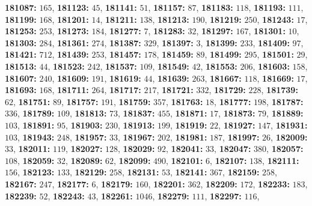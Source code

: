 \textsf{\bfseries 181087:} $165$, \textsf{\bfseries 181123:} $45$, \textsf{\bfseries 181141:} $51$, \textsf{\bfseries 181157:} $87$, \textsf{\bfseries 181183:} $118$, \textsf{\bfseries 181193:} $111$, \textsf{\bfseries 181199:} $168$, \textsf{\bfseries 181201:} $14$, \textsf{\bfseries 181211:} $138$, \textsf{\bfseries 181213:} $190$, \textsf{\bfseries 181219:} $250$, \textsf{\bfseries 181243:} $17$, \textsf{\bfseries 181253:} $253$, \textsf{\bfseries 181273:} $184$, \textsf{\bfseries 181277:} $7$, \textsf{\bfseries 181283:} $32$, \textsf{\bfseries 181297:} $167$, \textsf{\bfseries 181301:} $10$, \textsf{\bfseries 181303:} $284$, \textsf{\bfseries 181361:} $274$, \textsf{\bfseries 181387:} $329$, \textsf{\bfseries 181397:} $3$, \textsf{\bfseries 181399:} $233$, \textsf{\bfseries 181409:} $97$, \textsf{\bfseries 181421:} $712$, \textsf{\bfseries 181439:} $253$, \textsf{\bfseries 181457:} $178$, \textsf{\bfseries 181459:} $89$, \textsf{\bfseries 181499:} $295$, \textsf{\bfseries 181501:} $29$, \textsf{\bfseries 181513:} $44$, \textsf{\bfseries 181523:} $242$, \textsf{\bfseries 181537:} $109$, \textsf{\bfseries 181549:} $42$, \textsf{\bfseries 181553:} $206$, \textsf{\bfseries 181603:} $158$, \textsf{\bfseries 181607:} $240$, \textsf{\bfseries 181609:} $191$, \textsf{\bfseries 181619:} $44$, \textsf{\bfseries 181639:} $263$, \textsf{\bfseries 181667:} $118$, \textsf{\bfseries 181669:} $17$, \textsf{\bfseries 181693:} $168$, \textsf{\bfseries 181711:} $264$, \textsf{\bfseries 181717:} $217$, \textsf{\bfseries 181721:} $332$, \textsf{\bfseries 181729:} $228$, \textsf{\bfseries 181739:} $62$, \textsf{\bfseries 181751:} $89$, \textsf{\bfseries 181757:} $191$, \textsf{\bfseries 181759:} $357$, \textsf{\bfseries 181763:} $18$, \textsf{\bfseries 181777:} $198$, \textsf{\bfseries 181787:} $336$, \textsf{\bfseries 181789:} $109$, \textsf{\bfseries 181813:} $73$, \textsf{\bfseries 181837:} $455$, \textsf{\bfseries 181871:} $17$, \textsf{\bfseries 181873:} $79$, \textsf{\bfseries 181889:} $103$, \textsf{\bfseries 181891:} $95$, \textsf{\bfseries 181903:} $230$, \textsf{\bfseries 181913:} $199$, \textsf{\bfseries 181919:} $22$, \textsf{\bfseries 181927:} $147$, \textsf{\bfseries 181931:} $103$, \textsf{\bfseries 181943:} $248$, \textsf{\bfseries 181957:} $33$, \textsf{\bfseries 181967:} $202$, \textsf{\bfseries 181981:} $187$, \textsf{\bfseries 181997:} $26$, \textsf{\bfseries 182009:} $33$, \textsf{\bfseries 182011:} $119$, \textsf{\bfseries 182027:} $128$, \textsf{\bfseries 182029:} $92$, \textsf{\bfseries 182041:} $33$, \textsf{\bfseries 182047:} $380$, \textsf{\bfseries 182057:} $108$, \textsf{\bfseries 182059:} $32$, \textsf{\bfseries 182089:} $62$, \textsf{\bfseries 182099:} $490$, \textsf{\bfseries 182101:} $6$, \textsf{\bfseries 182107:} $138$, \textsf{\bfseries 182111:} $156$, \textsf{\bfseries 182123:} $133$, \textsf{\bfseries 182129:} $258$, \textsf{\bfseries 182131:} $53$, \textsf{\bfseries 182141:} $367$, \textsf{\bfseries 182159:} $258$, \textsf{\bfseries 182167:} $247$, \textsf{\bfseries 182177:} $6$, \textsf{\bfseries 182179:} $160$, \textsf{\bfseries 182201:} $362$, \textsf{\bfseries 182209:} $172$, \textsf{\bfseries 182233:} $183$, \textsf{\bfseries 182239:} $52$, \textsf{\bfseries 182243:} $43$, \textsf{\bfseries 182261:} $1046$, \textsf{\bfseries 182279:} $111$, \textsf{\bfseries 182297:} $116$, 
